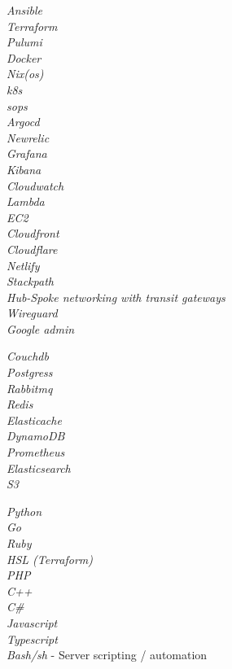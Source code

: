 \documentclass[10pt]{article} %
\begin{document}

{
\textit{Ansible}\\
\textit{Terraform}\\
\textit{Pulumi}\\
\textit{Docker}\\
\textit{Nix(os)}\\
\textit{k8s}\\
\textit{sops}\\
\textit{Argocd}\\
\textit{Newrelic}\\
\textit{Grafana}\\
\textit{Kibana}\\
\textit{Cloudwatch}\\
\textit{Lambda}\\
\textit{EC2}\\
\textit{Cloudfront}\\
\textit{Cloudflare}\\
\textit{Netlify}\\
\textit{Stackpath}\\
\textit{Hub-Spoke networking with transit gateways}\\
\textit{Wireguard}\\
\textit{Google admin}\\
}

 {
\textit{Couchdb}\\
\textit{Postgress}\\
\textit{Rabbitmq}\\
\textit{Redis}\\
\textit{Elasticache}\\
\textit{DynamoDB}\\
\textit{Prometheus}\\
\textit{Elasticsearch}\\
\textit{S3}\\
}

{
\textit{Python}\\
\textit{Go}\\
\textit{Ruby}\\
\textit{HSL (Terraform)}\\
\textit{PHP}\\
\textit{C++}\\
\textit{C\#}\\
\textit{Javascript}\\
\textit{Typescript}\\
\textit{Bash/sh} - Server scripting / automation
}
\end{document}
